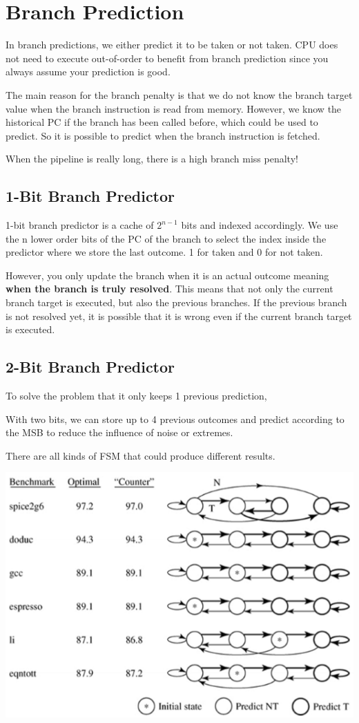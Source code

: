 \documentclass[letterpaper,12pt]{article}
\begin{document}
\section{Branch Prediction}
In branch predictions, we either predict it to be taken or not taken. CPU does not need to execute out-of-order to benefit from branch prediction since you always assume your prediction is good.

The main reason for the branch penalty is that we do not know the branch target value when the branch instruction is read from memory. However, we know the historical PC if the branch has been called before, which could be used to predict. So it is possible to predict when the branch instruction is fetched.

When the pipeline is really long, there is a high branch miss penalty!

\subsection{1-Bit Branch Predictor}
1-bit branch predictor is a cache of $2^{n-1}$ bits and indexed accordingly. We use the n lower order bits of the PC of the branch to select the index inside the predictor where we store the last outcome. 1 for taken and 0 for not taken.

However, you only update the branch when it is an actual outcome meaning \textbf{when the branch is truly resolved}. This means that not only the current branch target is executed, but also the previous branches. If the previous branch is not resolved yet, it is possible that it is wrong even if the current branch target is executed.

\subsection{2-Bit Branch Predictor}
To solve the problem that it only keeps 1 previous prediction,

With two bits, we can store up to 4 previous outcomes and predict according to the MSB to reduce the influence of noise or extremes.

There are all kinds of FSM that could produce different results.

\includegraphics*[scale = 0.7]{./Image/2 bit predictors.png}
\end{document}
